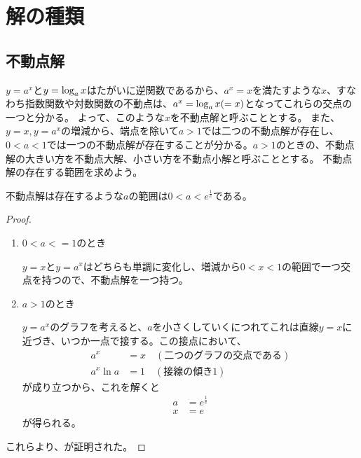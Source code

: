 \section{解の種類}

\subsection{不動点解}
	$y = a^x$と$y = \log_{a} x$はたがいに逆関数であるから、$a^x = x$を満たすような$x$、すなわち指数関数や対数関数の不動点は、$a^x = \log_{a} x( = x)$となってこれらの交点の一つと分かる。
	よって、このような$x$を不動点解と呼ぶこととする。
	また、$y = x,y = a^x$の増減から、端点を除いて$a > 1$では二つの不動点解が存在し、$0 < a < 1$では一つの不動点解が存在することが分かる。$a > 1$のときの、不動点解の大きい方を不動点大解、小さい方を不動点小解と呼ぶこととする。
	不動点解の存在する範囲を求めよう。
	\begin{theorem}
	\label{th:fixed_solutions}
		不動点解は存在するような$a$の範囲は$0 < a < e^\frac{1}{e}$である。
	\end{theorem}
	\begin{proof} \mbox{}\\
		\begin{enumerate}
			\item $0 < a <= 1$のとき
			
				$y = x$と$y = a^x$はどちらも単調に変化し、増減から$0 < x < 1$の範囲で一つ交点を持つので、不動点解を一つ持つ。
			\item $a > 1$のとき
			
				$y = a^x$のグラフを考えると、$a$を小さくしていくにつれてこれは直線$y = x$に近づき、いつか一点で接する。この接点において、
				\begin{align*}
					a^x &= x \quad (\text{二つのグラフの交点である}) \\
					a^x\ln{a} &= 1 \quad (\text{接線の傾き1})
				\end{align*}
				が成り立つから、これを解くと
				\begin{align*}
					a &= e^\frac{1}{e} \\
					x &= e 
				\end{align*}
				が得られる。
		\end{enumerate}
		これらより、が証明された。
	\end{proof}

